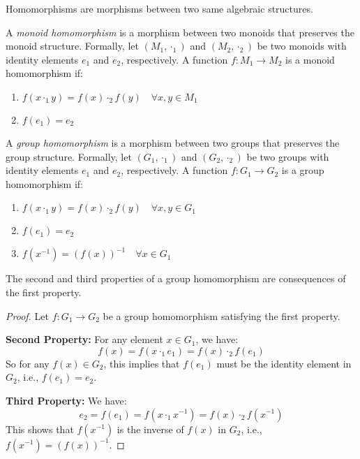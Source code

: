 \documentclass[
	11pt, %
	fleqn, %
	a4paper, %
]{LegrandOrangeBook}
\begin{document}
Homomorphisms are morphisms between two same algebraic structures. 

\begin{definition}
    A \emph{monoid homomorphism} is a morphism between two monoids that preserves the monoid structure. Formally, let $(M_1, \cdot_1)$ and $(M_2, \cdot_2)$ be two monoids with identity elements $e_1$ and $e_2$, respectively. A function $f: M_1 \to M_2$ is a monoid homomorphism if:
    \begin{enumerate}
        \item $f(x \cdot_1 y) = f(x) \cdot_2 f(y) \quad \forall x, y \in M_1$
        \item $f(e_1) = e_2$
    \end{enumerate}
\end{definition}

\begin{definition}
    A \emph{group homomorphism} is a morphism between two groups that preserves the group structure. Formally, let $(G_1, \cdot_1)$ and $(G_2, \cdot_2)$ be two groups with identity elements $e_1$ and $e_2$, respectively. A function $f: G_1 \to G_2$ is a group homomorphism if:
    \begin{enumerate}
        \item $f(x \cdot_1 y) = f(x) \cdot_2 f(y) \quad \forall x, y \in G_1$
        \item $f(e_1) = e_2$
        \item $f(x^{-1}) = (f(x))^{-1} \quad \forall x \in G_1$
    \end{enumerate}
\end{definition}

\begin{proposition}
    The second and third properties of a group homomorphism are consequences of the first property.
\end{proposition}

\begin{proof}
    Let $f: G_1 \to G_2$ be a group homomorphism satisfying the first property.

    \textbf{Second Property:} For any element $x \in G_1$, we have:
    \[
        f(x) = f(x \cdot_1 e_1) = f(x) \cdot_2 f(e_1)
    \]
    So for any $f(x) \in G_2$, this implies that $f(e_1)$ must be the identity element in $G_2$, i.e., $f(e_1) = e_2$.

    \textbf{Third Property:} We have:
    \[
        e_2 = f(e_1) = f(x \cdot_1 x^{-1}) = f(x) \cdot_2 f(x^{-1})
    \]
    This shows that $f(x^{-1})$ is the inverse of $f(x)$ in $G_2$, i.e., $f(x^{-1}) = (f(x))^{-1}$.
\end{proof}
\end{document}
